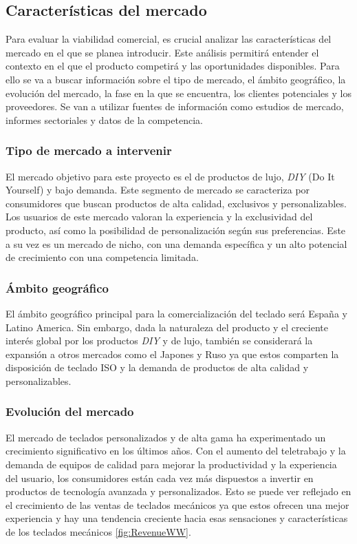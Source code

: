\subsection{Características del mercado}

Para evaluar la viabilidad comercial, es crucial analizar las características del mercado en el que se planea introducir. Este análisis permitirá entender el contexto en el que el producto competirá y las oportunidades disponibles. Para ello se va a buscar información sobre el tipo de mercado, el ámbito geográfico, la evolución del mercado, la fase en la que se encuentra, los clientes potenciales y los proveedores. Se van a utilizar fuentes de información como estudios de mercado, informes sectoriales y datos de la competencia. \cite{Comercial1} \cite{Comercial2} \cite{Comercial3}

\subsubsection{Tipo de mercado a intervenir}

El mercado objetivo para este proyecto es el de productos de lujo, \textit{DIY} (Do It Yourself) y bajo demanda. Este segmento de mercado se caracteriza por consumidores que buscan productos de alta calidad, exclusivos y personalizables. Los usuarios de este mercado valoran la experiencia y la exclusividad del producto, así como la posibilidad de personalización según sus preferencias. Este a su vez es un mercado de nicho, con una demanda específica y un alto potencial de crecimiento con una competencia limitada.

\subsubsection{Ámbito geográfico}

El ámbito geográfico principal para la comercialización del teclado será España y Latino America. Sin embargo, dada la naturaleza del producto y el creciente interés global por los productos \textit{DIY} y de lujo, también se considerará la expansión a otros mercados como el Japones y Ruso ya que estos comparten la disposición de teclado ISO y la demanda de productos de alta calidad y personalizables.

\subsubsection{Evolución del mercado}

El mercado de teclados personalizados y de alta gama ha experimentado un crecimiento significativo en los últimos años. Con el aumento del teletrabajo y la demanda de equipos de calidad para mejorar la productividad y la experiencia del usuario, los consumidores están cada vez más dispuestos a invertir en productos de tecnología avanzada y personalizados. Esto se puede ver reflejado en el crecimiento de las ventas de teclados mecánicos ya que estos ofrecen una mejor experiencia y hay una tendencia creciente hacia esas sensaciones y características de los teclados mecánicos \ref{fig:RevenueWW}.

